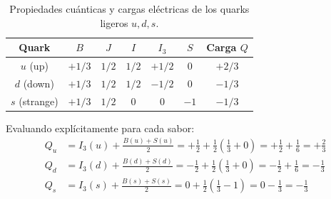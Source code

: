 \begin{table}[htbp]
    \centering
    \begin{tabular}{c c c c c c c}
        \toprule
        \textbf{Quark} & \textbf{$B$} & \textbf{$J$} & \textbf{$I$} & \textbf{$I_3$} & \textbf{$S$} & \textbf{Carga $Q$} \\
        \midrule
        $u$ (up) & $+1/3$ & $1/2$ & $1/2$ & $+1/2$ & $0$ & $+2/3$ \\
        $d$ (down) & $+1/3$ & $1/2$ & $1/2$ & $-1/2$ & $0$ & $-1/3$ \\
        $s$ (strange) & $+1/3$ & $1/2$ & $0$ & $0$ & $-1$ & $-1/3$ \\
        \bottomrule
    \end{tabular}
    \caption{Propiedades cuánticas y cargas eléctricas de los quarks ligeros $u, d, s$.}
    \label{tab:propiedades_quarks_uds}
\end{table}

Evaluando explícitamente para cada sabor:
\begin{align}
    Q_u &= I_3(u) + \frac{B(u) + S(u)}{2} = +\frac{1}{2} + \frac{1}{2}\left(\frac{1}{3} + 0\right) = +\frac{1}{2} + \frac{1}{6} = +\frac{2}{3} \\
    Q_d &= I_3(d) + \frac{B(d) + S(d)}{2} = -\frac{1}{2} + \frac{1}{2}\left(\frac{1}{3} + 0\right) = -\frac{1}{2} + \frac{1}{6} = -\frac{1}{3} \\
    Q_s &= I_3(s) + \frac{B(s) + S(s)}{2} = 0 + \frac{1}{2}\left(\frac{1}{3} - 1\right) = 0 - \frac{1}{3} = -\frac{1}{3}
\end{align}